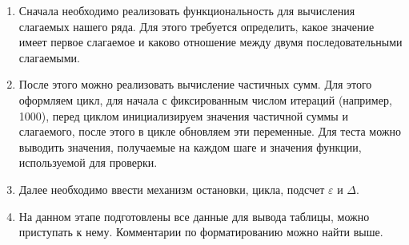 \begin{comment}
\begin{itemize}
	\item Здесь нужно оставить описание того, как сделать пошаговое вычисление суммы ряда.
	
	Непонятно только, что тут еще писать, как именно реализовывать работу? В целом тут нужно написать план в стиле:
	\begin{enumerate}
		\item Определитесь с первым членом последовательности
		\item Найдите, как выражается через $x$ и $i$ $v_{k+1}/v_k$. 
		\item Напишите обычный цикл, который вычисляет сумму  первых N членов последовательности и выведите на экран ее и референсное значение функции.
		\item Замените цикл на нормальный.
		 
	\end{enumerate}
	\item Описать, как должен выглядеть заголовок и одна строка таблицы (на живом примере). Описать особенности задания формата в функции printf.
	\item Напишите прототип функции построения таблицы. /*Можно вставить сам прототип*/ Напишите код, выводящий заголовок.
	Затем, напишите цикл, который выводит равномерные значения $x$ от $a$ до $b$. 
	\item Вставьте в тело цикла код вывода одной строчки таблицы.
\end{itemize}
\end{comment}
\zzsectionPLAN

\begin{enumerate}
\item Сначала необходимо реализовать функциональность для вычисления слагаемых нашего ряда. Для этого требуется определить, какое значение имеет первое слагаемое и каково отношение между двумя последовательными слагаемыми.
\item После этого можно реализовать вычисление частичных сумм. Для этого оформляем цикл, для начала с фиксированным числом итераций (например, 1000), перед циклом инициализируем значения частичной суммы и слагаемого, после этого в цикле обновляем эти переменные. Для теста можно выводить значения, получаемые на каждом шаге и значения функции, используемой для проверки.
\item Далее необходимо ввести механизм остановки, цикла, подсчет $\varepsilon$ и $\Delta$.
\item На данном этапе подготовлены все данные для вывода таблицы, можно приступать к нему. Комментарии по форматированию можно найти выше. 
\end{enumerate}


